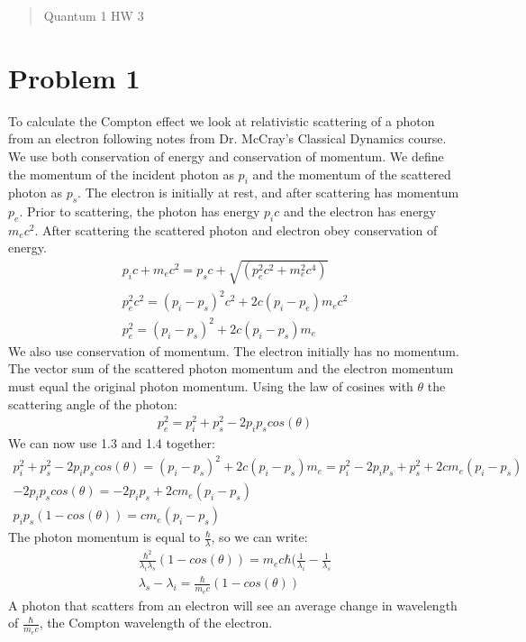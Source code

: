 \documentclass[a4paper,10pt]{article}
\title{}
\author{Vince Baker}
\numberwithin{equation}{section}
\begin{document}
\maketitle

\begin{abstract}
Quantum 1 HW 3
\end{abstract}

\section{Problem 1}
To calculate the Compton effect we look at relativistic scattering of a photon from an electron following notes from Dr. McCray's Classical Dynamics course. 
We use both conservation of energy and conservation of momentum.
We define the momentum of the incident photon as $p_i$ and the momentum of the scattered photon as $p_s$.
The electron is initially at rest, and after scattering has momentum $p_e$.
Prior to scattering, the photon has energy $p_ic$ and the electron has energy $m_ec^2$. 
After scattering the scattered photon and electron obey conservation of energy.
\begin{gather}
 p_ic+m_ec^2=p_sc+\sqrt{(p_e^2c^2+m_e^2c^4)}\\
 p_e^2c^2=(p_i-p_s)^2c^2+2c(p_i-p_e)m_ec^2\\
 p_e^2=(p_i-p_s)^2+2c(p_i-p_s)m_e
\end{gather}
We also use conservation of momentum. The electron initially has no momentum.
The vector sum of the scattered photon momentum and the electron momentum must equal the original photon momentum.
Using the law of cosines with $\theta$ the scattering angle of the photon:
\begin{gather}
 p_e^2=p_i^2+p_s^2-2p_ip_scos(\theta)
\end{gather}
We can now use 1.3 and 1.4 together:
\begin{gather}
 p_i^2+p_s^2-2p_ip_scos(\theta)=(p_i-p_s)^2+2c(p_i-p_s)m_e=p_i^2-2p_ip_s+p_s^2+2cm_e(p_i-p_s)\\
 -2p_ip_scos(\theta)=-2p_ip_s+2cm_e(p_i-p_s)\\
 p_ip_s(1-cos(\theta))=cm_e(p_i-p_s)
\end{gather}
The photon momentum is equal to $\frac{\hbar}{\lambda}$, so we can write:
\begin{gather}
 \frac{\hbar ^2}{\lambda_i \lambda_s}(1-cos(\theta))=m_ec\hbar (\frac{1}{\lambda_i}-\frac{1}{\lambda_s}\\
 \lambda_s - \lambda_i = \frac{\hbar}{m_ec}(1-cos(\theta))
\end{gather}
A photon that scatters from an electron will see an average change in wavelength of $\frac{\hbar}{m_ec}$, the Compton wavelength of the electron.
\end{document}
